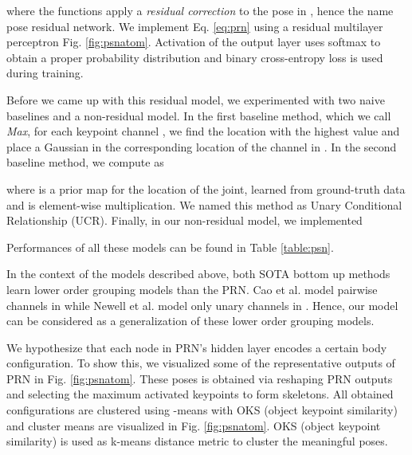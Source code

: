 \documentclass[runningheads]{llncs}
\begin{document}
\noindent where the functions  apply a \textit{residual correction} to the pose in , hence the name pose residual network. We implement Eq. \ref{eq:prn} using a residual multilayer perceptron Fig. \ref{fig:psnatom}. Activation of the output layer uses softmax to obtain a proper probability distribution and binary cross-entropy loss is used during training. 


Before we came up with this residual model, we experimented with two naive baselines and a non-residual model. In the first baseline method, which we call \textit{Max}, for each keypoint channel , we find the location with the highest value and place  a Gaussian in the corresponding location of the  channel in .  In the second baseline method, we compute  as 





\noindent where  is a prior map for the location of the  joint, learned from ground-truth data and  is element-wise multiplication. We named this method as Unary Conditional Relationship (UCR). Finally, in our non-residual model, we implemented 





\noindent Performances of all these models can be found in Table   \ref{table:psn}. 


In the context of the models described above, both SOTA bottom up methods learn lower order grouping models than the PRN. Cao et al. \cite{Cao2016} model pairwise channels in  while Newell et al. \cite{Newell2016b} model only unary channels in . Hence, our model can be considered as a generalization of these lower order grouping models. 






















We hypothesize that each node in PRN's hidden layer encodes a certain body configuration. To show this, we visualized some of the representative outputs of PRN in Fig. \ref{fig:psnatom}. These poses is obtained via reshaping PRN outputs and selecting the maximum activated keypoints to form skeletons. All obtained configurations are clustered using -means with OKS (object keypoint similarity)\cite{Lin2014} and cluster means are visualized in Fig. \ref{fig:psnatom}. OKS (object keypoint similarity) is used as k-means distance metric to cluster the meaningful poses.
 
\end{document}
